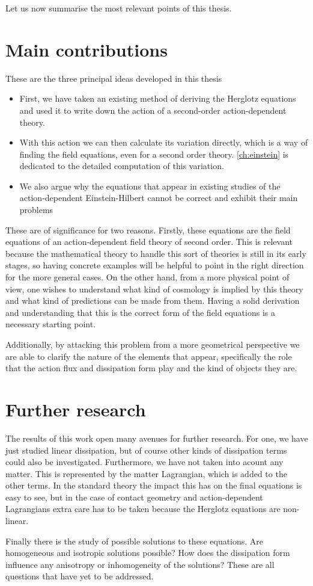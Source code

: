 \documentclass[../main.tex]{subfiles}
\begin{document}
Let us now summarise the most relevant points of this thesis. 

\section{Main contributions}
These are the three principal ideas developed in this thesis
\begin{itemize}
	\item First, we have taken an existing method of deriving the Herglotz equations and
		used it to write down the action of a second-order action-dependent theory. 
	\item With this action we can then calculate its variation directly, which is a way of
		finding the field equations, even for a second order theory. \cref{ch:einstein} is
		dedicated to the detailed computation of this variation. 
	\item We also argue why the equations that appear in existing studies of the
		action-dependent Einstein-Hilbert cannot be correct and exhibit their main problems
\end{itemize}
These are of significance for two reasons. Firstly, these equations are the field
equations of an action-dependent field theory of second order. This is relevant because
the mathematical theory to handle this sort of theories is still in its early stages, so
having concrete examples will be helpful to point in the right direction for the more
general cases. On the other hand, from a more physical point of view, one wishes to
understand what kind of cosmology is implied by this theory and what kind of predictions
can be made from them. Having a solid derivation and understanding that this is the
correct form of the field equations is a necessary starting point. 

Additionally, by attacking this problem from a more geometrical perspective we are able to
clarify the nature of the elements that appear, specifically the role that the action flux
and dissipation form play and the kind of objects they are. 

\section{Further research}
The results of this work open many avenues for further research. For one, we have just
studied linear dissipation, but of course other kinds of dissipation terms could also be
investigated. Furthermore, we have not taken into acount any matter. This is represented
by the matter Lagrangian, which is added to the other terms. In the standard theory the
impact this has on the final equations is easy to see, but in the case of contact geometry
and action-dependent Lagrangians extra care has to be taken because the Herglotz equations
are non-linear. 

Finally there is the study of possible solutions to these equations. Are homogeneous and
isotropic solutions possible? How does the dissipation form influence any anisotropy or
inhomogeneity of the solutions? These are all questions that have yet to be addressed. 
\end{document}
